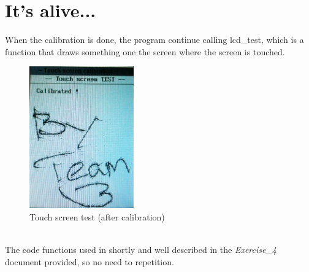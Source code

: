 \section{It's alive...}
When the calibration is done, the program continue calling lcd\_test, which is a function that draws something one the screen where the screen is touched.
\begin{figure}[h!]
   \centering
   \includegraphics[width=0.4\textwidth]{lcd_test.jpg}
   \caption{Touch screen test (after calibration)}
   \label{fig:example}
\end{figure}
\textbf{ }\\ \newline
The code functions used in shortly and well described in the \textit{Exercise\_4} document provided, so no need to repetition.

